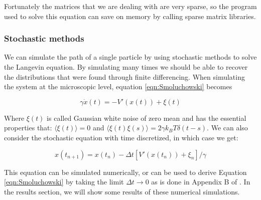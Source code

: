 \documentclass[11pt]{article} %
\begin{document}
Fortunately the matrices that we are dealing with are very sparse, so the program used to solve this equation can save on memory by calling sparse matrix libraries.

%
%
\subsubsection{Stochastic methods}
We can simulate the path of a single particle by using stochastic methods to solve the Langevin equation. By simulating many times we should be able to recover the distributions that were found through finite differencing. When simulating the system  at the microscopic level, equation \ref{eqn:Smoluchowski} becomes \cite{Reimann2001}

\begin{equation}
\gamma \dot{x}(t) = -V'(x(t)) + \xi(t)
\end{equation}

Where $\xi(t)$ is called Gaussian white noise of zero mean and has the essential properties that: $\langle \xi(t) \rangle = 0$ and $\langle \xi(t) \xi(s) \rangle = 2 \gamma k_B T \delta(t - s) $. We can also consider the stochastic equation with time discretized, in which case we get:

\begin{equation}
x(t_{n+1}) = x(t_n) - \Delta t [V'(x(t_n)) + \xi_n]/\gamma
\end{equation}

This equation can be simulated numerically, or can be used to derive Equation \ref{eqn:Smoluchowski} by taking the limit $\Delta t \to 0$ as is done in Appendix B of \cite{Reimann2001}. In the results section, we will show some results of these numerical simulations.
\end{document}
